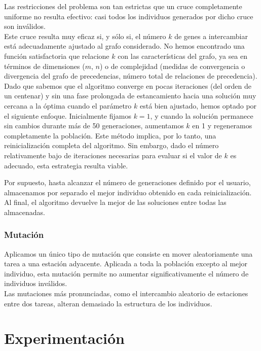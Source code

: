 \documentclass[12pt,a4paper]{report}
\begin{document}
    Las restricciones del problema son tan estrictas que un cruce completamente uniforme no resulta efectivo: casi todos los individuos generados por dicho cruce son inválidos.\\

    Este cruce resulta muy eficaz si, y sólo si, el número \(k\) de genes a intercambiar está adecuadamente ajustado al grafo considerado. No hemos encontrado una función satisfactoria que relacione \(k\) con las características del grafo, ya sea en términos de dimensiones (\(m\), \(n\)) o de complejidad (medidas de convergencia o divergencia del grafo de precedencias, número total de relaciones de precedencia).\\
    Dado que sabemos que el algoritmo converge en pocas iteraciones (del orden de un centenar) y sin una fase prolongada de estancamiento hacia una solución muy cercana a la óptima cuando el parámetro \(k\) está bien ajustado, hemos optado por el siguiente enfoque. Inicialmente fijamos \(k = 1\), y cuando la solución permanece sin cambios durante más de 50 generaciones, aumentamos \(k\) en 1 y regeneramos completamente la población. Este método implica, por lo tanto, una reinicialización completa del algoritmo. Sin embargo, dado el número relativamente bajo de iteraciones necesarias para evaluar si el valor de \(k\) es adecuado, esta estrategia resulta  viable.

    Por supuesto, hasta alcanzar el número de generaciones definido por el usuario, almacenamos por separado el mejor individuo obtenido en cada reinicialización. Al final, el algoritmo devuelve la mejor de las soluciones entre todas las almacenadas.


    \subsection{Mutación}

    Aplicamos un único tipo de mutación que consiste en mover aleatoriamente una tarea a una estación adyacente. Aplicada a toda la población excepto al mejor individuo, esta mutación permite no aumentar significativamente el número de individuos inválidos.\\
    Las mutaciones más pronunciadas, como el intercambio aleatorio de estaciones entre dos tareas, alteran demasiado la estructura de los individuos.
    \chapter{Experimentación}
\end{document}
